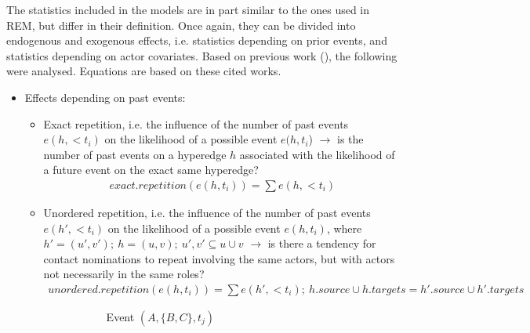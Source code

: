 The statistics included in the models are in part similar to the ones used in REM, but differ in their definition. Once again, they can be divided into endogenous and exogenous effects, i.e. statistics depending on prior events, and statistics depending on actor covariates. Based on previous work (\cite{lerner2019rem,lerner2021relational,hancean2021role,hancean2022occupations}), the following were analysed. Equations are based on these cited works.

\begin{itemize}
	\item Effects depending on past events:
	\begin{itemize}
		\item Exact repetition, i.e. the influence of the number of past events $e(h,<t_i)$ on the likelihood of a possible event $e(h,t_i$) $\rightarrow$ is the number of past events on a hyperedge $h$ associated with the likelihood of a future event on the exact same hyperedge?
		\begin{align*}
			exact.repetition(e(h,t_i)) = \sum e(h,<t_i)
		\end{align*}
		\item Unordered repetition, i.e. the influence of the number of past events $e(h',<t_i)$ on the likelihood of a possible event $e(h,t_i)$, where $h' = (u',v'); \: h = (u,v); \: u',v' \subseteq u \cup v$ $\rightarrow$ is there a tendency for contact nominations to repeat involving the same actors, but with actors not necessarily in the same roles?
		\begin{align*}
			unordered.repetition(e(h,t_i)) = \sum e(h',<t_i); \: h.source \cup h.targets = h'.source \cup h'.targets
		\end{align*}
		\begin{figure}
			\begin{mdframed}
				\centering
				\begin{subfigure}[t]{0.45\linewidth}
					\vskip 0pt
					\caption{Event $(A,\{B,C\},t_j)$}
				\end{subfigure}
				\hfill
				\begin{subfigure}[t]{0.45\linewidth}
					\vskip 0pt
\end{subfigure}
\end{mdframed}
\end{figure}
\end{itemize}
\end{itemize}
